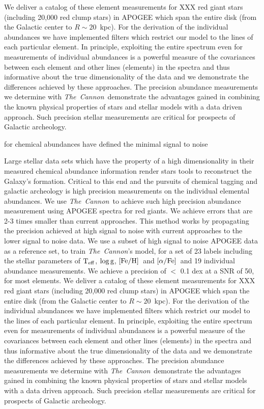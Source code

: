 \documentclass[12pt, preprint]{aastex}
\newcommand{\project}[1]{\textsl{#1}}
\newcommand{\tc}{\project{The~Cannon}}
\newcommand{\teff}{\mbox{$\rm T_{eff}$}}
\newcommand{\feh}{\mbox{$\rm [Fe/H]$}}
\newcommand{\alphafe}{\mbox{$\rm [\alpha/Fe]$}}
\newcommand{\logg}{\mbox{$\rm \log g$}}
\begin{document}
We deliver a catalog of these element measurements for XXX red giant stars (including 20,000 red clump stars) in APOGEE which span the entire disk (from the Galactic center to $R\sim 20$~kpc). 
For the derivation of the individual abundances we have implemented filters which restrict our model to the lines of each particular element. In principle, exploiting the entire spectrum even for measurements of individual abundances is a powerful measure of the covariances between each element and other lines (elements) in the spectra and thus informative about the true dimensionality of the data and we demonstrate the differences achieved by these approaches. The precision abundance measurements we determine with \tc\ demonstrate the advantages gained in combining the known physical properties of stars and stellar models with a data driven approach. Such precision stellar measurements are critical for prospects of Galactic archeology.


 for chemical abundances have defined the minimal signal to noise

Large stellar data sets which have the property of a high dimensionality in their measured chemical abundance information render stars tools to reconstruct the Galaxy's formation. Critical to this end and the pursuits of chemical tagging and galactic archeology is high precision measurements on the individual elemental abundances. We use \tc\ to achieve such high precision abundance measurement using APOGEE spectra for red giants. We achieve errors that are 2-3 times smaller than current approaches.  This method works by propagating the precision achieved at high signal to noise with current approaches to the lower signal to noise data. We use a subset of high signal to noise APOGEE data as a reference set, to train \tc's model, for a set of 23 labels including the stellar parameters of \teff, \logg, \feh\ and \alphafe\ and 19 individual abundance measurements. We achieve a precision of $<$ 0.1 dex at a SNR of 50, for most elements.  We deliver a catalog of these element measurements for XXX red giant stars (including 20,000 red clump stars) in APOGEE which span the entire disk (from the Galactic center to $R\sim 20$~kpc). 
For the derivation of the individual abundances we have implemented filters which restrict our model to the lines of each particular element. In principle, exploiting the entire spectrum even for measurements of individual abundances is a powerful measure of the covariances between each element and other lines (elements) in the spectra and thus informative about the true dimensionality of the data and we demonstrate the differences achieved by these approaches. The precision abundance measurements we determine with \tc\ demonstrate the advantages gained in combining the known physical properties of stars and stellar models with a data driven approach. Such precision stellar measurements are critical for prospects of Galactic archeology.
\end{document}
